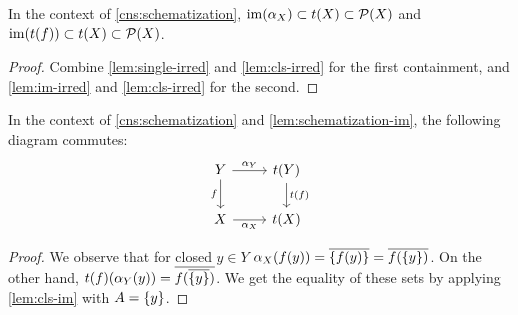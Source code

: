 \begin{lem}\label{lem:schematization-im}
In the context of \cref{cns:schematization},
$\mathrm{im}(\alpha_X) \subset t(X) \subset \mathcal{P}(X)$ and
$\mathrm{im}(t(f)) \subset t(X) \subset \mathcal{P}(X)$.
\end{lem}
\begin{proof}
Combine \cref{lem:single-irred} and \cref{lem:cls-irred}
for the first containment, and
\cref{lem:im-irred} and \cref{lem:cls-irred}
for the second.
\end{proof}

\begin{lem}\label{lem:schematization-nat}
In the context of \cref{cns:schematization} and \cref{lem:schematization-im},
the following diagram commutes:
\[\begin{tikzcd}
Y \ar[r, "\alpha_Y"] \ar[d, "f" left] & t(Y) \ar[d, "t(f)"] \\
X \ar[r, "\alpha_X" below] & t(X)
\end{tikzcd}\]
\end{lem}
\begin{proof}
We observe that for closed $y \in Y$
$\alpha_X(f(y)) = \cls{\set{f(y)}} = \cls{f(\set{y})}$.
On the other hand, $t(f)(\alpha_Y(y)) = \cls{f(\cls{\set{y}})}$.
We get the equality of these sets by applying \cref{lem:cls-im} with
$A = \set{y}$.
\end{proof}

